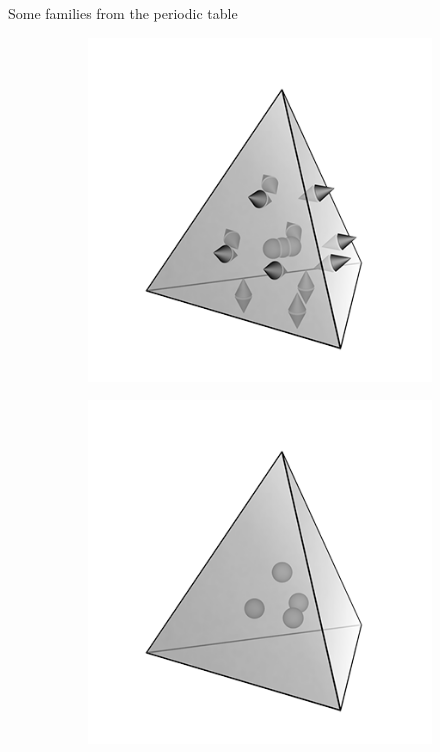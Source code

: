 \documentclass[aspectratio=169]{beamer}
\begin{document}
\begin{frame}{Some families from the periodic table}
\begin{figure}
\begin{subfigure}[t]{0.23\textwidth}
	\end{subfigure}\hfill
	\begin{subfigure}[t]{0.23\textwidth}
		\includegraphics[width=\columnwidth]{N1f2_tetrahedron.png}%
	\end{subfigure}\hfill
	\begin{subfigure}[t]{0.23\textwidth}
		\includegraphics[width=\columnwidth]{dP1_tetrahedron.png}%
	\end{subfigure}\hfill
\end{figure}

\end{frame}
\end{document}
